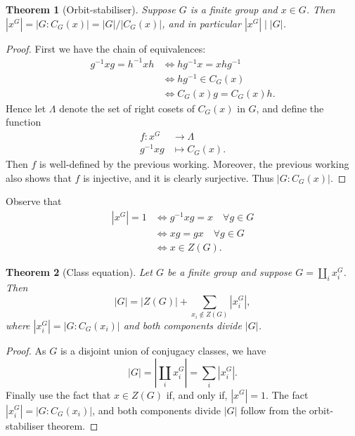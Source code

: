 \documentclass[11pt, notitlepage]{article}
\numberwithin{equation}{section}
\theoremstyle{plain}
\newtheorem{theorem}{Theorem}[section]
\theoremstyle{definition}
\newcommand{\abs}[1]{\left\lvert#1\right\rvert}
\begin{document}
\begin{theorem}[Orbit-stabiliser]
Suppose $G$ is a finite group and $x \in G$. Then $|x^G| = |G:C_G(x)| = |G|/|C_G(x)|$, and in particular $|x^G| \mid |G|$.
\end{theorem}

\begin{proof}
First we have the chain of equivalences:
\begin{align*}
    g^{-1}xg = h^{-1}xh &\iff hg^{-1}x = xhg^{-1}\\
    &\iff hg^{-1} \in C_G(x)\\
    &\iff C_G(x)g = C_G(x)h.
\end{align*}
Hence let $\Lambda$ denote the set of right cosets of $C_G(x)$ in $G$, and define the function
\begin{align*}
    f : x^G &\to \Lambda\\
    g^{-1}xg &\mapsto C_G(x).
\end{align*}
Then $f$ is well-defined by the previous working. Moreover, the previous working also shows that $f$ is injective, and it is clearly surjective. Thus $|G : C_G(x)|$.
\end{proof}

Observe that
\begin{align*}
    |x^G| = 1 &\iff g^{-1}xg = x \quad \forall g \in G\\
    &\iff xg = gx \quad \forall g \in G\\
    &\iff x \in Z(G).
\end{align*}


\begin{theorem}[Class equation]
Let $G$ be a finite group and suppose $G = \coprod_i x_i^G$. Then
\[
    |G| = |Z(G)| + \sum_{x_i \notin Z(G)} |x_i^G|,
\]
where $|x_i^G| = |G : C_G(x_i)|$ and both components divide $|G|$.
\end{theorem}

\begin{proof}
As $G$ is a disjoint union of conjugacy classes, we have
\[
    |G| = \abs{\coprod_i x_i^G} = \sum_i |x_i^G|.
\]
Finally use the fact that $x \in Z(G)$ if, and only if, $|x^G| = 1$. The fact $|x_i^G| = |G : C_G(x_i)|$, and both components divide $|G|$ follow from the orbit-stabiliser theorem. 
\end{proof}
\end{document}
